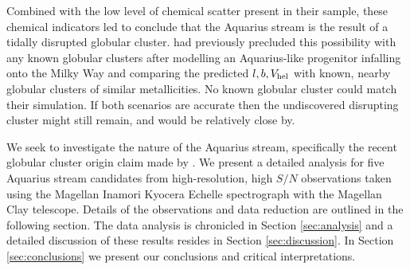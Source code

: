 \documentclass{emulateapj}
\begin{document}
Combined with the low level of chemical scatter present in their sample, these chemical indicators led \citet{wylie-de-boer;et-al_2012} to conclude that the Aquarius stream is the result of a tidally disrupted globular cluster. \citet{williams;et-al_2011} had previously precluded this possibility with any known globular clusters after modelling an Aquarius-like progenitor infalling onto the Milky Way and comparing the predicted $l, b, V_{\rm hel}$ with known, nearby globular clusters of similar metallicities. No known globular cluster could match their simulation. If both scenarios are accurate then the undiscovered disrupting cluster might still remain, and would be relatively close by.

We seek to investigate the nature of the Aquarius stream, specifically the recent globular cluster origin claim made by \citet{wylie-de-boer;et-al_2012}. We present a detailed analysis for five Aquarius stream candidates from high-resolution, high $S/N$ observations taken using the Magellan Inamori Kyocera Echelle spectrograph \citep{bernstein;et-al_2003} with the Magellan Clay telescope. Details of the observations and data reduction are outlined in the following section. The data analysis is chronicled in Section \ref{sec:analysis} and a detailed discussion of these results resides in Section \ref{sec:discussion}. In Section \ref{sec:conclusions} we present our conclusions and critical interpretations.
\end{document}
